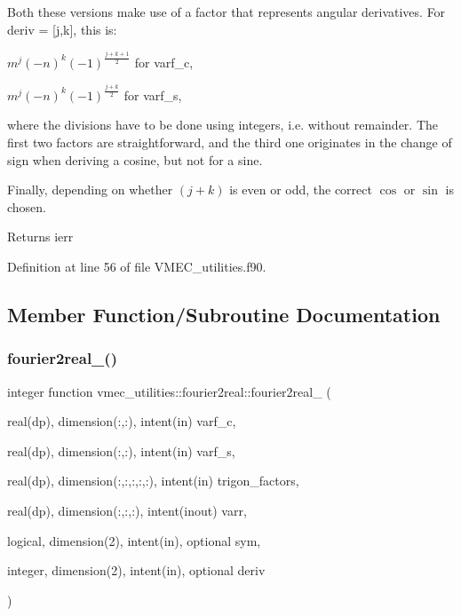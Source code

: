 Both these versions make use of a factor that represents angular derivatives. For {\ttfamily deriv = \mbox{[}j,k\mbox{]}}, this is\+:
\begin{DoxyItemize}
\item $m^j (-n)^k (-1)^{\frac{j+k+1}{2}}$ for {\ttfamily varf\+\_\+c},
\item $m^j (-n)^k (-1)^{\frac{j+k}{2}}$ for {\ttfamily varf\+\_\+s},
\end{DoxyItemize}

where the divisions have to be done using integers, i.\+e. without remainder. The first two factors are straightforward, and the third one originates in the change of sign when deriving a cosine, but not for a sine.

Finally, depending on whether $(j+k)$ is even or odd, the correct $\cos$ or $\sin$ is chosen.

\begin{DoxyReturn}{Returns}
ierr 
\end{DoxyReturn}


Definition at line 56 of file V\+M\+E\+C\+\_\+utilities.\+f90.



\subsection{Member Function/\+Subroutine Documentation}
\mbox{\label{interfacevmec__utilities_1_1fourier2real_a5e88c64e893bd56ad8e19f6c66c7f62a}} 
\subsubsection{\texorpdfstring{fourier2real\+\_()}{fourier2real\_1()}}
{\footnotesize\ttfamily integer function vmec\+\_\+utilities\+::fourier2real\+::fourier2real\+\_ (\begin{DoxyParamCaption}\item[{real(dp), dimension(\+:,\+:), intent(in)}]{varf\+\_\+c,  }\item[{real(dp), dimension(\+:,\+:), intent(in)}]{varf\+\_\+s,  }\item[{real(dp), dimension(\+:,\+:,\+:,\+:,\+:), intent(in)}]{trigon\+\_\+factors,  }\item[{real(dp), dimension(\+:,\+:,\+:), intent(inout)}]{varr,  }\item[{logical, dimension(2), intent(in), optional}]{sym,  }\item[{integer, dimension(2), intent(in), optional}]{deriv }\end{DoxyParamCaption})}



